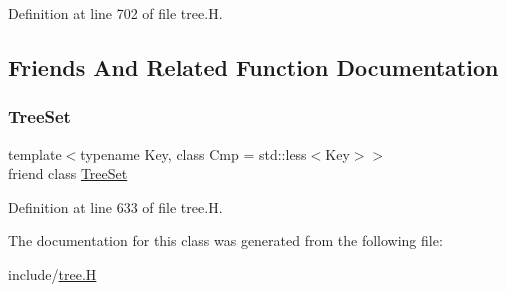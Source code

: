 Definition at line 702 of file tree.\+H.



\subsection{Friends And Related Function Documentation}
\mbox{\label{class_designar_1_1_tree_set_1_1_inorder_iterator_a7caa42294700d2a60905ec3458a7cd8a}} 
\subsubsection{\texorpdfstring{Tree\+Set}{TreeSet}}
{\footnotesize\ttfamily template$<$typename Key, class Cmp = std\+::less$<$\+Key$>$$>$ \\
friend class \hyperlink{class_designar_1_1_tree_set}{Tree\+Set}\hspace{0.3cm}{\ttfamily [friend]}}



Definition at line 633 of file tree.\+H.



The documentation for this class was generated from the following file\+:\begin{DoxyCompactItemize}
\item 
include/\hyperlink{tree_8_h}{tree.\+H}\end{DoxyCompactItemize}
